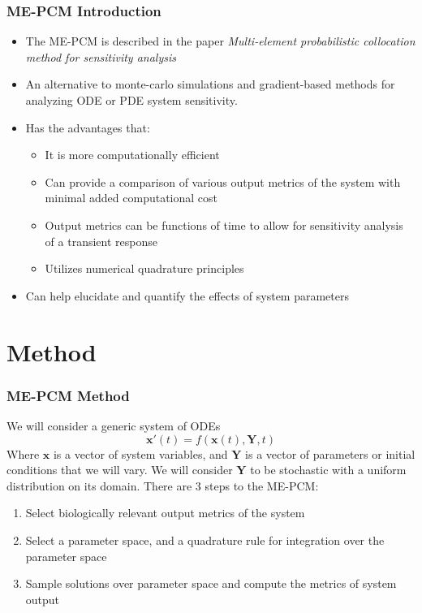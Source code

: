 \documentclass{beamer}
\theoremstyle{plain}
\theoremstyle{definition}
\begin{document}
\begin{frame}\frametitle{ME-PCM Introduction}
\begin{itemize}
  \item The ME-PCM is described in the paper \emph{Multi-element probabilistic collocation method for sensitivity analysis} \cite{foo_multi-element_2009}
  \item An alternative to monte-carlo simulations and gradient-based methods for analyzing ODE or PDE system sensitivity.
  \item Has the advantages that:
    \begin{itemize}
     \item It is more computationally efficient
     \item Can provide a comparison of various output metrics of the system with minimal added computational cost
     \item Output metrics can be functions of time to allow for sensitivity analysis of a transient response
     \item Utilizes numerical quadrature principles
    \end{itemize}
  \item Can help elucidate and quantify the effects of system parameters
\end{itemize}
\end{frame}

\section{Method}

\begin{frame}\frametitle{ME-PCM Method}
 We will consider a generic system of ODEs
 \begin{equation*}
  \mathbf{x}'(t) = f(\mathbf{x}(t),\mathbf{Y},t)
 \end{equation*}
 Where $\mathbf{x}$ is a vector of system variables, and $\mathbf{Y}$ is a vector of parameters or initial conditions that we will vary. We will consider $\mathbf{Y}$ to be stochastic with a uniform distribution on its domain. There are 3 steps to the ME-PCM:
 \begin{enumerate}
  \item Select biologically relevant output metrics of the system
  \item Select a parameter space, and a quadrature rule for integration over the parameter space
  \item Sample solutions over parameter space and compute the metrics of system output
 \end{enumerate}
\end{frame}
\end{document}
